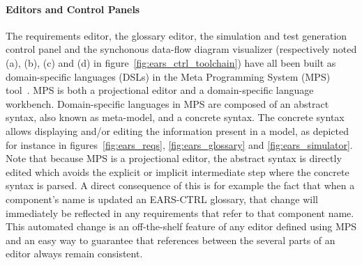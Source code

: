 \paragraph{\textbf{Editors and Control Panels}\\} 
\hspace{-.2cm}
The requirements editor, the glossary editor, the simulation and
test generation control panel and the synchonous data-flow diagram visualizer (respectively
noted (\textsf{a}), (\textsf{b}), (\textsf{c}) and (\textsf{d}) in figure~\ref{fig:ears_ctrl_toolchain}) have all been built as 
domain-specific languages (DSLs) in the Meta Programming System (MPS)
tool~\cite{mps}.
MPS is both a projectional editor and a domain-specific language workbench.
Domain-specific languages in MPS are composed of an abstract syntax, also known
as meta-model, and a concrete syntax. The concrete syntax allows displaying
and/or editing the information present in a model, as depicted for instance in
figures~\ref{fig:ears_reqs}, \ref{fig:ears_glossary} and
\ref{fig:ears_simulator}. Note that because MPS is a projectional editor, the
abstract syntax is directly edited which avoids the explicit or implicit
intermediate step where the concrete syntax is parsed.
A direct consequence of this is for example the fact that when a component's
name is updated an \textsf{EARS-CTRL} glossary, that change will immediately be
reflected in any requirements that refer to that component name. This automated
change is an off-the-shelf feature of any editor defined using MPS and an easy
way to guarantee that references between the several parts of an editor always
remain consistent.\vspace{-.2cm}
